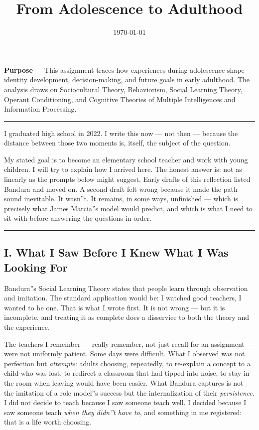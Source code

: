 \documentclass[12pt,a4paper]{article}
\begin{document}
\title{From Adolescence to Adulthood}
\date{\today}

\maketitle

\textbf{Purpose} --- This assignment traces how experiences during adolescence shape identity development, decision-making, and future goals in early adulthood. The analysis draws on Sociocultural Theory, Behaviorism, Social Learning Theory, Operant Conditioning, and Cognitive Theories of Multiple Intelligences and Information Processing.

\begin{center}
\rule{0.5\textwidth}{0.4pt}
\end{center}

I graduated high school in 2022. I write this now --- not then --- because the distance between those two moments is, itself, the subject of the question.

My stated goal is to become an elementary school teacher and work with young children. I will try to explain how I arrived here. The honest answer is: not as linearly as the prompts below might suggest. Early drafts of this reflection listed Bandura and moved on. A second draft felt wrong because it made the path sound inevitable. It wasn''t. It remains, in some ways, unfinished --- which is precisely what James Marcia''s model would predict, and which is what I need to sit with before answering the questions in order.

\begin{center}
\rule{0.5\textwidth}{0.4pt}
\end{center}

\subsection{I. What I Saw Before I Knew What I Was Looking For}

Bandura''s Social Learning Theory states that people learn through observation and imitation. The standard application would be: I watched good teachers, I wanted to be one. That is what I wrote first. It is not wrong --- but it is incomplete, and treating it as complete does a disservice to both the theory and the experience.

The teachers I remember --- really remember, not just recall for an assignment --- were not uniformly patient. Some days were difficult. What I observed was not perfection but \emph{attempts}: adults choosing, repeatedly, to re-explain a concept to a child who was lost, to redirect a classroom that had tipped into noise, to stay in the room when leaving would have been easier. What Bandura captures is not the imitation of a role model''s success but the internalization of their \emph{persistence}. I did not decide to teach because I saw someone teach well. I decided because I saw someone teach \emph{when they didn''t have to}, and something in me registered: that is a life worth choosing.
\end{document}
